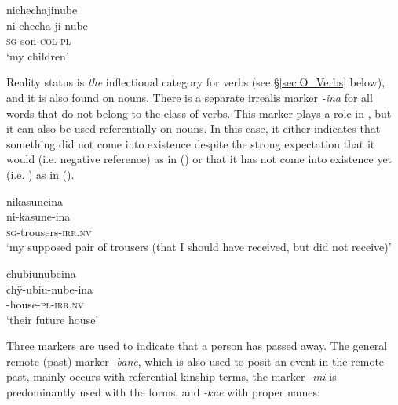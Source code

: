 \ea\label{ex:Sketch-COL-PL}
\begingl
\glpreamble nichechajinube\\
\gla ni-checha-ji-nube\\
\textsc{sg}-son-\textsc{col}-\textsc{pl}\\
\glft ‘my children’\\
\endgl
\xe

Reality status is \textit{the} inflectional category for verbs (see §\ref{sec:O_Verbs} below), and it is also found on nouns. There is a separate irrealis marker \textit{-ina} for all words that do not belong to the class of verbs. This marker plays a role in , but it can also be used referentially on nouns. In this case, it either indicates that something did not come into existence despite the strong expectation that it would (i.e. negative reference) as in () or that it has not come into existence yet (i.e. ) as in ().

\ea\label{ex:Sketch-NIRR-neg}
\begingl
\glpreamble nikasuneina\\
\gla ni-kasune-ina\\
\textsc{sg}-trousers-\textsc{irr.nv}\\
\glft ‘my supposed pair of trousers (that I should have received, but did not receive)’\\
\endgl
\xe

\ea\label{ex:Sketch-NIRR-fut}
\begingl
\glpreamble chubiunubeina\\
\gla chÿ-ubiu-nube-ina\\
-house-\textsc{pl}-\textsc{irr.nv}\\
\glft ‘their future house’\\
\endgl
\xe
{}

Three markers are used to indicate that a person has passed away. The general remote (past) marker \textit{-bane}, which is also used to posit an event in the remote past, mainly occurs with referential kinship terms, the marker \textit{-ini} is predominantly used with the  forms, and \textit{-kue} with proper names:

